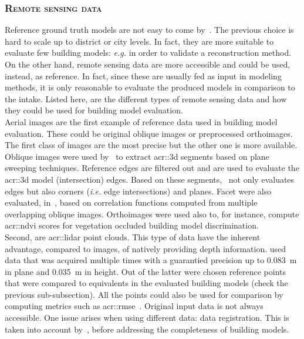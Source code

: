         \subsubsection{\textsc{Remote sensing data}}
            Reference ground truth models are not easy to come by~\parencite{schuster2003new}.
            The previous choice is hard to scale up to district or city levels.
            In fact, they are more suitable to evaluate few building models: \textit{e.g.} in order to validate a reconstruction method.
            On the other hand, remote sensing data are more accessible and could be used, instead, as reference.
            In fact, since these are usually fed as input in modeling methods, it is only reasonable to evaluate the produced models in comparison to the intake.
            Listed here, are the different types of remote sensing data and how they could be used for building model evaluation.\\

            Aerial images are the first example of reference data used in building model evaluation.
            These could be original oblique images or preprocessed orthoimages.
            The first class of images are the most precise but the other one is more available.
            Oblique images were used by~\textcite{michelin2013quality} to extract \gls{acr::3d} segments based on plane sweeping techniques.
            Reference edges are filtered out and are used to evaluate the \gls{acr::3d} model (intersection) edges.
            Based on these segments,~\textcite{boudet2006supervised} not only evaluates edges but also corners (\textit{i.e.} edge intersections) and planes.
            Facet were also evaluated, in~\parencite{boudet2006supervised}, based on correlation functions computed from multiple overlapping oblique images.
            Orthoimages were used also to, for instance, compute \gls{acr::ndvi} scores for vegetation occluded building model discrimination.\\

            Second, are \gls{acr::lidar} point clouds.
            This type of data have the inherent advantage, compared to images, of natively providing depth information.
            \textcite{kaartinen2005accuracy} used data that was acquired multiple times with a guarantied precision up to \SI{0.083}{\m} in plane and \SI{0.035}{\m} in height.
            Out of the latter were chosen reference points that were compared to equivalents in the evaluated building models (check the previous sub-subsection).
            All the points could also be used for comparison by computing metrics such as \gls{acr::rmse}~\parencite{lafarge2012creating,zhu2018large}.
            Original input data is not always accessible.
            One issue arises when using different data: data registration.
            This is taken into account by~\textcite{akca2010quality}, before addressing the completeness of building models.\\
            

